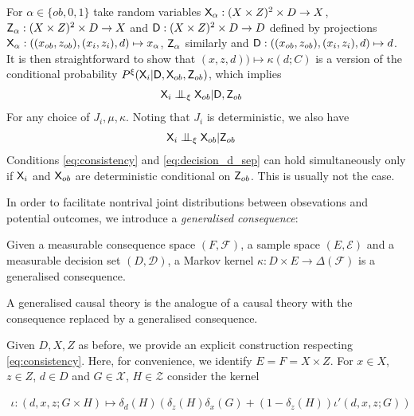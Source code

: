 For $\alpha\in\{ob,0,1\}$ take random variables $\mathsf{X}_\alpha:(X\times Z)^2\times D\to X$, $\mathsf{Z}_\alpha:(X\times Z)^2\times D\to X$ and $\mathsf{D}:(X\times Z)^2\times D\to D$ defined by projections $\mathsf{X}_\alpha:((x_{ob},z_{ob}),(x_i,z_i),d)\mapsto x_\alpha$, $\mathsf{Z}_\alpha$ similarly and $\mathsf{D}:((x_{ob},z_{ob}),(x_i,z_i),d)\mapsto d$. It is then straightforward to show that $(x,z,d))\mapsto \kappa(d; C)$ is a version of the conditional probability $P^\xi(\mathsf{X}_i|\mathsf{D},\mathsf{X}_{ob},\mathsf{Z}_{ob})$, which implies 
\begin{align}
    \RV{X}_i&\CI_\xi \RV{X}_{ob}|\RV{D}, \RV{Z}_{ob}
\end{align}
For any choice of $J_i,\mu,\kappa$. Noting that $J_i$ is deterministic, we also have
\begin{align}
    \RV{X}_i&\CI_\xi \RV{X}_{ob}|\RV{Z}_{ob} \label{eq:decision_d_sep}
\end{align}
Conditions \ref{eq:consistency} and \ref{eq:decision_d_sep} can hold simultaneously only if $\mathsf{X}_i$ and $\mathsf{X}_{ob}$ are deterministic conditional on $\mathsf{Z}_{ob}$. This is usually not the case.

In order to facilitate nontrival joint distributions between obsevations and potential outcomes, we introduce a \emph{generalised consequence}:

\begin{definition}
Given a measurable consequence space $(F,\mathcal{F})$, a sample space $(E,\mathcal{E})$ and a measurable decision set $(D,\mathcal{D})$, a Markov kernel $\kappa:D\times E \to \Delta(\mathcal{F})$ is a generalised consequence.
\end{definition}

\begin{definition}
A generalised causal theory is the analogue of a causal theory with the consequence replaced by a generalised consequence.
\end{definition}

Given $D,X,Z$ as before, we provide an explicit construction respecting \ref{eq:consistency}. Here, for convenience, we identify $E=F=X\times Z$. For $x\in X$, $z\in Z$, $d\in D$ and $G\in \mathcal{X}$, $H\in \mathcal{Z}$ consider the kernel

\begin{align}
    \iota: (d,x,z;G\times H) \mapsto \delta_d(H)(\delta_z(H) \delta_x(G) + (1-\delta_z(H)) \iota'(d,x,z;G))
\end{align}

